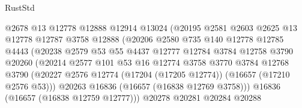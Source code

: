 \begin{lexlean}{RustStd}
\begin{coremodule}
                                @2678
                                @13
                                @12778
                                @12888
                                @12914
                                @13024
                                (@20195
                                  @2581
                                  @2603
                                  @2625
                                  @13
                                  @12778
                                  @12787
                                  @3758
                                  @12888
                                  (@20206
                                    @2580
                                    @735
                                    @140
                                    @12778
                                    @12785
                                    @4443
                                    (@20238
                                      @2579
                                      @53
                                      @55
                                      @4437
                                      @12777
                                      @12784
                                      @3784
                                      @12758
                                      @3790
                                      @20260
                                      (@20214
                                        @2577
                                        @101
                                        @53
                                        @16
                                        @12774
                                        @3758
                                        @3770
                                        @3784
                                        @12768
                                        @3790
                                        (@20227
                                          @2576
                                          @12774
                                          (@17204 (@17205 @12774))
                                          (@16657 (@17210 @2576 @53)))
                                        @20263
                                        @16836
                                        (@16657 (@16838 @12769 @3758)))
                                      @16836
                                      (@16657 (@16838 @12759 @12777)))
                                    @20278
                                    @20281
                                    @20284
                                    @20288

\end{coremodule}
\end{lexlean}
